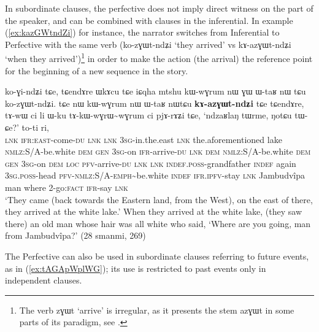 \documentclass[oldfontcommands,oneside,a4paper,11pt]{article}
\newcommand{\ipa}[1]{{\phon \mbox{#1}}} %
\newcommand{\refb}[1]{(\ref{#1})}
\newcommand{\factual}[1]{\textsc{:fact}}
\newcommand{\rdp}{\textasciitilde{}}
\begin{document}
In subordinate clauses, the perfective does not imply direct witness on the part of the speaker, and can be combined with clauses in the inferential. In example \refb{ex:kazGWtndZi} for instance, the narrator switches from Inferential to Perfective with the same verb (\ipa{ko-zɣɯt-ndʑi} `they arrived' vs \ipa{kɤ-azɣɯt-ndʑi} `when they arrived')\footnote{The verb \ipa{zɣɯt} `arrive' is irregular, as it presents the stem \ipa{azɣɯt} in some parts of its paradigm, see \citet[424]{jacques04these}. } in order to make the action (the arrival) the reference point for the beginning of a new sequence in the story.

\begin{exe}
\ex \label{ex:kazGWtndZi}
\gll \ipa{tɕendɤre} 	\ipa{ko-ɣi-ndʑi} 	\ipa{tɕe,} 	\ipa{tɕendɤre} 	\ipa{ɯkɤcu} 	\ipa{tɕe} 	\ipa{iɕqha} 	\ipa{mtshu} 	\ipa{kɯ-wɣrum} 	\ipa{nɯ} 	\ipa{ɣɯ} 	\ipa{ɯ-taʁ} 	\ipa{nɯ} \ipa{tɕu} 	\ipa{ko-zɣɯt-ndʑi.} \ipa{tɕe} 	\ipa{nɯ} 	\ipa{kɯ-wɣrum} 	\ipa{nɯ} 	\ipa{ɯ-taʁ} 	\ipa{nɯtɕu} 	\textbf{\ipa{kɤ-azɣɯt-ndʑi}} 	\ipa{tɕe} 	\ipa{tɕendɤre,} 
\ipa{tɤ-wɯ} 	\ipa{ci} 	\ipa{li} 	\ipa{ɯ-ku} 	\ipa{tɤ-kɯ-wɣrɯ\rdp{}wɣrum} 	\ipa{ci} 	\ipa{pjɤ-rɤʑi} \ipa{tɕe,} \ipa{`ndzaʁlaŋ} 	\ipa{tɯrme,} 	\ipa{ŋotɕu} 	\ipa{tɯ-ɕe?'} 	\ipa{to-ti} 	\ipa{ri,} \\
\textsc{lnk} \textsc{ifr:east}-come-\textsc{du} \textsc{lnk}  \textsc{lnk} \textsc{3sg}-in.the.east  \textsc{lnk} the.aforementioned lake \textsc{nmlz}:S/A-be.white \textsc{dem} \textsc{gen} \textsc{3sg}-on \textsc{ifr}-arrive-\textsc{du} \textsc{lnk} \textsc{dem} \textsc{nmlz}:S/A-be.white \textsc{dem} \textsc{gen} \textsc{3sg}-on \textsc{dem} \textsc{loc} \textsc{pfv}-arrive-\textsc{du}  \textsc{lnk}  \textsc{lnk} \textsc{indef.poss}-grandfather \textsc{indef} again \textsc{3sg.poss}-head \textsc{pfv}-\textsc{nmlz}:S/A-\textsc{emph}\rdp{}be.white  \textsc{indef} \textsc{ifr.ipfv}-stay   \textsc{lnk} Jambudvîpa man where 2-go\factual{} \textsc{ifr}-say \textsc{lnk} \\
\glt `They came (back towards the Eastern land, from the West), on the east of there, they arrived at the white lake.' When they arrived at the white lake, (they saw there) an old man whose hair was all white who said, `Where are you going, man from Jambudvîpa?' (28 smanmi, 269)
\end{exe}

The Perfective can also be used in subordinate clauses referring to future events, as in \refb{ex:tAGApWplWG}; its use is restricted to past events only in independent clauses.
\end{document}
